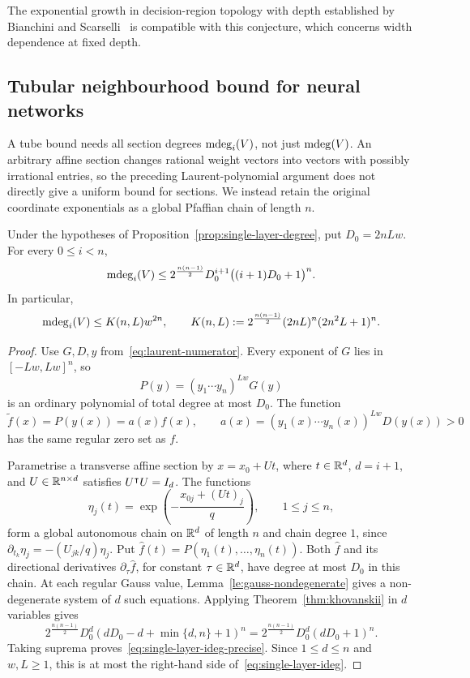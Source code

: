 The exponential growth in decision-region topology with depth established by Bianchini and Scarselli~\cite[Theorem~5 and Appendix~F]{bianchini2014complexity} is compatible with this conjecture, which concerns width dependence at fixed depth.

\subsection{Tubular neighbourhood bound for neural networks}\label{subsec:tube-nn}
A tube bound needs all section degrees $\operatorname{\mathrm{mdeg}}_i(V)$, not just $\operatorname{\mathrm{mdeg}}(V)$. An arbitrary affine section changes rational weight vectors into vectors with possibly irrational entries, so the preceding Laurent-polynomial argument does not directly give a uniform bound for sections. We instead retain the original coordinate exponentials as a global Pfaffian chain of length $n$.

\begin{proposition}\label{prop:single-layer-ideg}
Under the hypotheses of Proposition~\ref{prop:single-layer-degree}, put $D_0=2nLw$. For every $0\le i<n$,
\begin{equation}\label{eq:single-layer-ideg-precise}
\operatorname{\mathrm{mdeg}}_i(V)\le
2^{\frac{n(n-1)}2}D_0^{i+1}\bigl((i+1)D_0+1\bigr)^n.
\end{equation}
In particular,
\begin{equation}\label{eq:single-layer-ideg}
\operatorname{\mathrm{mdeg}}_i(V)\le K(n,L)w^{2n},\qquad
K(n,L):=2^{\frac{n(n-1)}2}(2nL)^n(2n^2L+1)^n.
\end{equation}
\end{proposition}

\begin{proof}
Use $G,D,y$ from~\eqref{eq:laurent-numerator}. Every exponent of $G$ lies in $[-Lw,Lw]^n$, so
\[
P(y)=(y_1\cdots y_n)^{Lw}G(y)
\]
is an ordinary polynomial of total degree at most $D_0$. The function
\[
\widetilde f(x)=P(y(x))=a(x)f(x),
\qquad
a(x)=(y_1(x)\cdots y_n(x))^{Lw}D(y(x))>0
\]
has the same regular zero set as $f$.

Parametrise a transverse affine section by $x=x_0+Ut$, where $t\in\mathbb{R}^d$, $d=i+1$, and $U\in\mathbb{R}^{n\times d}$ satisfies $U^{\intercal}U=I_d$. The functions
\[
\eta_j(t)=\exp\!\left(-\frac{x_{0j}+(Ut)_j}{q}\right),\qquad 1\le j\le n,
\]
form a global autonomous chain on $\mathbb{R}^d$ of length $n$ and chain degree $1$, since
$\partial_{t_k}\eta_j=-(U_{jk}/q)\eta_j$. Put $\widehat f(t)=P(\eta_1(t),\dots,\eta_n(t))$. Both $\widehat f$ and its directional derivatives $\partial_\tau\widehat f$, for constant $\tau\in\mathbb{R}^d$, have degree at most $D_0$ in this chain. At each regular Gauss value, Lemma~\ref{le:gauss-nondegenerate} gives a non-degenerate system of $d$ such equations. Applying Theorem~\ref{thm:khovanskii} in $d$ variables gives
\[
2^{\frac{n(n-1)}2}D_0^d(dD_0-d+\min\{d,n\}+1)^n
=2^{\frac{n(n-1)}2}D_0^d(dD_0+1)^n.
\]
Taking suprema proves~\eqref{eq:single-layer-ideg-precise}. Since $1\le d\le n$ and $w,L\ge1$, this is at most the right-hand side of~\eqref{eq:single-layer-ideg}.
\end{proof}

